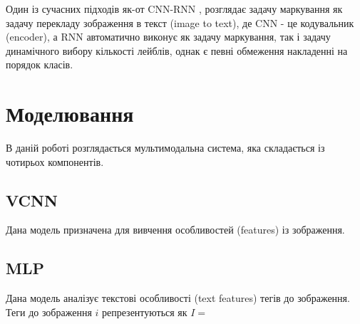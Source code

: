 \documentclass{udstu}
\begin{document}
Один із сучасних підходів як-от CNN-RNN \cite{cnn-rnn},
розглядає задачу маркування як задачу перекладу зображення в текст (image to text),
де CNN - це кодувальник (encoder), а RNN автоматично виконує як задачу маркування,
так і задачу динамічного вибору кількості лейблів, однак є певні обмеження
накладенні на порядок класів.


\chapter{Моделювання}

В даній роботі розглядається мультимодальна система, яка складається із чотирьох компонентів.

\section{VCNN}

Дана модель призначена для вивчення особливостей (features) із зображення.


\section{MLP}

Дана модель аналізує текстові особливості (text features) тегів до зображення.
Теги до зображення $i$ репрезентуються як $I = $


\conclusions




\end{document}
